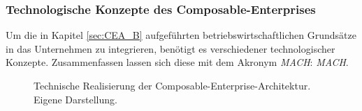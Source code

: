 \subsubsection{Technologische Konzepte des Composable-Enterprises}
Um die in Kapitel \ref{sec:CEA_B} aufgeführten betriebswirtschaftlichen Grundsätze in das Unternehmen zu integrieren, benötigt es verschiedener technologischer Konzepte. Zusammenfassen lassen sich diese mit dem Akronym \textit{MACH}: \textit{\acl{MACH}}.
\begin{center}
	\begin{figure}[H]
		\centering
		\caption[Technische Realisierung der Composable-Enterprise-Architektur]{Technische Realisierung der Composable-Enterprise-Archi\-tektur. Eigene Darstellung.}
		\label{fig:CEA_K}
	\end{figure}	
\end{center}
\vspace*{-15mm}

